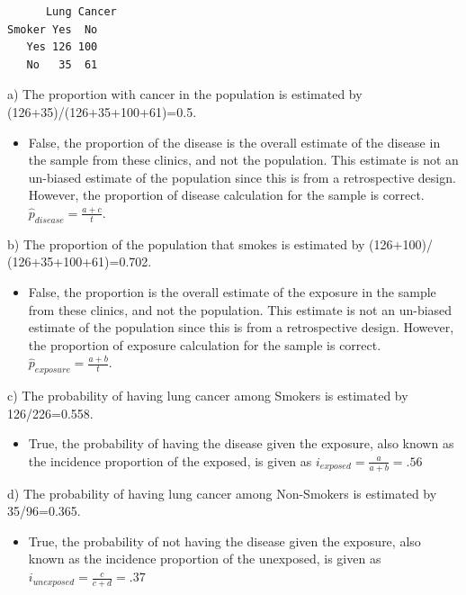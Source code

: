 \documentclass[
  letterpaper,
  DIV=11,
  numbers=noendperiod]{scrartcl}
\providecommand{\tightlist}{%
  \setlength{\itemsep}{0pt}\setlength{\parskip}{0pt}}\usepackage{longtable,booktabs,array}
\begin{document}
\begin{verbatim}
      Lung Cancer
Smoker Yes  No
   Yes 126 100
   No   35  61
\end{verbatim}

a) The proportion with cancer in the population is estimated by
(126+35)/(126+35+100+61)=0.5.

\begin{itemize}
\tightlist
\item
  False, the proportion of the disease is the overall estimate of the
  disease in the sample from these clinics, and not the population. This
  estimate is not an un-biased estimate of the population since this is
  from a retrospective design. However, the proportion of disease
  calculation for the sample is correct.
  \(\hat{p}_{disease} = \frac{a+c}{t}\).
\end{itemize}

b) The proportion of the population that smokes is estimated by
(126+100)/ (126+35+100+61)=0.702.

\begin{itemize}
\tightlist
\item
  False, the proportion is the overall estimate of the exposure in the
  sample from these clinics, and not the population. This estimate is
  not an un-biased estimate of the population since this is from a
  retrospective design. However, the proportion of exposure calculation
  for the sample is correct. \(\hat{p}_{exposure} = \frac{a+b}{t}\).
\end{itemize}

c) The probability of having lung cancer among Smokers is estimated by
126/226=0.558.

\begin{itemize}
\tightlist
\item
  True, the probability of having the disease given the exposure, also
  known as the incidence proportion of the exposed, is given as
  \(i_{exposed} = \frac{a}{a+b} = .56\)
\end{itemize}

d) The probability of having lung cancer among Non-Smokers is estimated
by 35/96=0.365.

\begin{itemize}
\tightlist
\item
  True, the probability of not having the disease given the exposure,
  also known as the incidence proportion of the unexposed, is given as
  \(i_{unexposed} = \frac{c}{c+d} = .37\)
\end{itemize}
\end{document}
